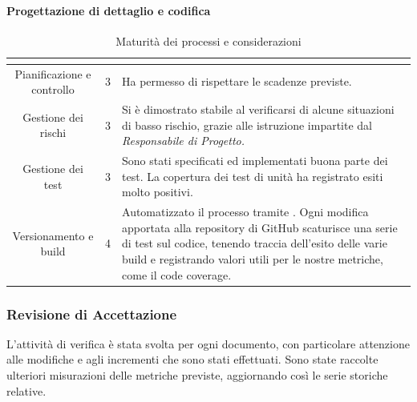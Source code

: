 \paragraph{Progettazione di dettaglio e codifica} \Spazio
\renewcommand{\arraystretch}{1.5}
\begin{table}[H]
	\begin{center}
		\begin{tabular}{|c|c|p{6.8cm}|}
			\hline
			\rowcolor{title_row}
			\textbf{\color{title_text}{Processo}} & \textbf{\color{title_text}{Livello di maturità}} & \textbf{\color{title_text}{Considerazioni}} \\
			\hline
			{Pianificazione e controllo} & {3} & {Ha permesso di rispettare le scadenze previste.}\\	
			\hline
			{Gestione dei rischi} & {3} & {Si è dimostrato stabile al verificarsi di alcune situazioni di basso rischio, grazie alle istruzione impartite dal \emph{Responsabile di Progetto.}}\\	
			\hline
			{Gestione dei test} & {3} & {Sono stati specificati ed implementati buona parte dei test. La copertura dei test di unità ha registrato esiti molto positivi.}\\	
			\hline
			{Versionamento e build} & {4} & {Automatizzato il processo tramite \gl{Travis}.} Ogni modifica apportata alla repository di GitHub scaturisce una serie di test sul codice, tenendo traccia dell'esito delle varie build e registrando valori utili per le nostre metriche, come il code coverage.\\	
			\hline
		\end{tabular}
		\caption[Maturità dei processi, Progettazione di dettaglio e codifica]{Maturità dei processi e considerazioni}	
		\label{tabella: considerazioni sulla maturità dei processi raggiunta rq}
	\end{center}
\end{table}
\renewcommand{\arraystretch}{1}


\subsubsection{Revisione di Accettazione}
L'attività di verifica è stata svolta per ogni documento, con particolare attenzione alle modifiche e agli incrementi che sono stati effettuati. Sono state raccolte ulteriori misurazioni delle metriche previste, aggiornando così le serie storiche relative.
